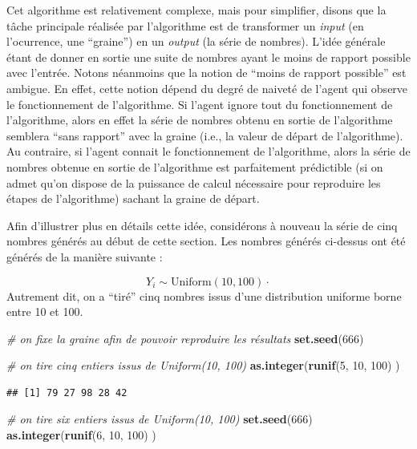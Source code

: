 \documentclass[
  a4paper,11pt,twoside,onecolumn,openright,final,oldfontcommands]{memoir}
\newenvironment{Shaded}{\begin{snugshade}}{\end{snugshade}}
\newcommand{\CommentTok}[1]{\textcolor[rgb]{0.56,0.35,0.01}{\textit{#1}}}
\newcommand{\DecValTok}[1]{\textcolor[rgb]{0.00,0.00,0.81}{#1}}
\newcommand{\KeywordTok}[1]{\textcolor[rgb]{0.13,0.29,0.53}{\textbf{#1}}}
\newcommand{\NormalTok}[1]{#1}
\theoremstyle{definition}
\theoremstyle{definition}
\theoremstyle{definition}
\theoremstyle{remark}
\begin{document}
Cet algorithme est relativement complexe, mais pour simplifier, disons que la tâche principale réalisée par l'algorithme est de transformer un \emph{input} (en l'ocurrence, une ``graine'') en un \emph{output} (la série de nombres). L'idée générale étant de donner en sortie une suite de nombres ayant le moins de rapport possible avec l'entrée. Notons néanmoins que la notion de ``moins de rapport possible'' est ambigue. En effet, cette notion dépend du degré de naiveté de l'agent qui observe le fonctionnement de l'algorithme. Si l'agent ignore tout du fonctionnement de l'algorithme, alors en effet la série de nombres obtenu en sortie de l'algorithme semblera ``sans rapport'' avec la graine (i.e., la valeur de départ de l'algorithme). Au contraire, si l'agent connait le fonctionnement de l'algorithme, alors la série de nombres obtenue en sortie de l'algorithme est parfaitement prédictible (si on admet qu'on dispose de la puissance de calcul nécessaire pour reproduire les étapes de l'algorithme) sachant la graine de départ.

Afin d'illustrer plus en détails cette idée, considérons à nouveau la série de cinq nombres générés au début de cette section. Les nombres générés ci-dessus ont été générés de la manière suivante :

\[Y_{i} \sim \mathrm{Uniform}(10, 100) \cdot\]
Autrement dit, on a ``tiré'' cinq nombres issus d'une distribution uniforme borne entre 10 et 100.

\begin{Shaded}
\begin{Highlighting}[]
\CommentTok{\# on fixe la graine afin de pouvoir reproduire les résultats}
\KeywordTok{set.seed}\NormalTok{(}\DecValTok{666}\NormalTok{)}

\CommentTok{\# on tire cinq entiers issus de Uniform(10, 100)}
\KeywordTok{as.integer}\NormalTok{(}\KeywordTok{runif}\NormalTok{(}\DecValTok{5}\NormalTok{, }\DecValTok{10}\NormalTok{, }\DecValTok{100}\NormalTok{) )}
\end{Highlighting}
\end{Shaded}

\begin{verbatim}
## [1] 79 27 98 28 42
\end{verbatim}

\begin{Shaded}
\begin{Highlighting}[]
\CommentTok{\# on tire six entiers issus de Uniform(10, 100)}
\KeywordTok{set.seed}\NormalTok{(}\DecValTok{666}\NormalTok{)}
\KeywordTok{as.integer}\NormalTok{(}\KeywordTok{runif}\NormalTok{(}\DecValTok{6}\NormalTok{, }\DecValTok{10}\NormalTok{, }\DecValTok{100}\NormalTok{) )}
\end{Highlighting}
\end{Shaded}
\end{document}

